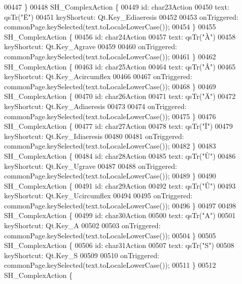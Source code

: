 \begin{DoxyCode}
00447     \}
00448     SH\_ComplexAction \{
00449         \textcolor{keywordtype}{id}: char23Action
00450         text: qsTr(\textcolor{stringliteral}{"Ë"})
00451         keyShortcut: Qt.Key\_Ediaeresis
00452 
00453         onTriggered: commonPage.keySelected(text.toLocaleLowerCase());
00454     \}
00455     SH\_ComplexAction \{
00456         \textcolor{keywordtype}{id}: char24Action
00457         text: qsTr(\textcolor{stringliteral}{"À"})
00458         keyShortcut: Qt.Key\_Agrave
00459 
00460         onTriggered: commonPage.keySelected(text.toLocaleLowerCase());
00461     \}
00462     SH\_ComplexAction \{
00463         \textcolor{keywordtype}{id}: char25Action
00464         text: qsTr(\textcolor{stringliteral}{"Â"})
00465         keyShortcut: Qt.Key\_Acircumflex
00466 
00467         onTriggered: commonPage.keySelected(text.toLocaleLowerCase());
00468     \}
00469     SH\_ComplexAction \{
00470         \textcolor{keywordtype}{id}: char26Action
00471         text: qsTr(\textcolor{stringliteral}{"Ä"})
00472         keyShortcut: Qt.Key\_Adiaeresis
00473 
00474         onTriggered: commonPage.keySelected(text.toLocaleLowerCase());
00475     \}
00476     SH\_ComplexAction \{
00477         \textcolor{keywordtype}{id}: char27Action
00478         text: qsTr(\textcolor{stringliteral}{"Ï"})
00479         keyShortcut: Qt.Key\_Idiaeresis
00480 
00481         onTriggered: commonPage.keySelected(text.toLocaleLowerCase());
00482     \}
00483     SH\_ComplexAction \{
00484         \textcolor{keywordtype}{id}: char28Action
00485         text: qsTr(\textcolor{stringliteral}{"Ù"})
00486         keyShortcut: Qt.Key\_Ugrave
00487 
00488         onTriggered: commonPage.keySelected(text.toLocaleLowerCase());
00489     \}
00490     SH\_ComplexAction \{
00491         \textcolor{keywordtype}{id}: char29Action
00492         text: qsTr(\textcolor{stringliteral}{"Û"})
00493         keyShortcut: Qt.Key\_Ucircumflex
00494 
00495         onTriggered: commonPage.keySelected(text.toLocaleLowerCase());
00496     \}
00497 
00498     SH\_ComplexAction \{
00499         \textcolor{keywordtype}{id}: char30Action
00500         text: qsTr(\textcolor{stringliteral}{"A"})
00501         keyShortcut: Qt.Key\_A
00502 
00503         onTriggered: commonPage.keySelected(text.toLocaleLowerCase());
00504     \}
00505     SH\_ComplexAction \{
00506         \textcolor{keywordtype}{id}: char31Action
00507         text: qsTr(\textcolor{stringliteral}{"S"})
00508         keyShortcut: Qt.Key\_S
00509 
00510         onTriggered: commonPage.keySelected(text.toLocaleLowerCase());
00511     \}
00512     SH\_ComplexAction \{

\end{DoxyCode}
